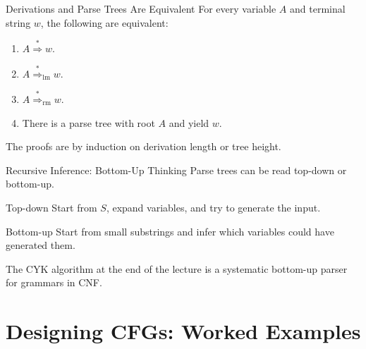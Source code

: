 \documentclass[aspectratio=169,10pt]{beamer}
\newcommand{\ders}{\overset{*}{\Rightarrow}}
\begin{document}
\begin{frame}{Derivations and Parse Trees Are Equivalent}
\small
For every variable \(A\) and terminal string \(w\), the following are equivalent:

\begin{enumerate}
    \item \(A\ders w\).
    \item \(A\ders_{\mathrm{lm}} w\).
    \item \(A\ders_{\mathrm{rm}} w\).
    \item There is a parse tree with root \(A\) and yield \(w\).
\end{enumerate}

\begin{center}
\end{center}

The proofs are by induction on derivation length or tree height.
\end{frame}

\begin{frame}{Recursive Inference: Bottom-Up Thinking}
\small
Parse trees can be read top-down or bottom-up.

\begin{block}{Top-down}
Start from \(S\), expand variables, and try to generate the input.
\end{block}

\begin{exampleblock}{Bottom-up}
Start from small substrings and infer which variables could have generated them.
\end{exampleblock}

\vspace{0.5em}
The CYK algorithm at the end of the lecture is a systematic bottom-up parser for grammars in CNF.
\end{frame}

\section{Designing CFGs: Worked Examples}
\end{document}
